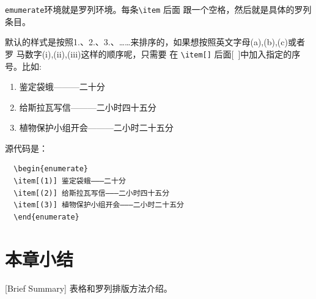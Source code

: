 \texttt{emumerate}环境就是罗列环境。每条\verb|\item| 后面
跟一个空格，然后就是具体的罗列条目。

默认的样式是按照1.、2.、3.、……来排序的，如果想按照英文字母(a),(b),(c)或者罗
马数字(i),(ii),(iii)这样的顺序呢，只需要
在 \verb|\item[]| 后面[~]中加入指定的序号。比如:
\begin{enumerate}
  \item[(1)] 鉴定袋蛾———二十分
  \item[(2)] 给斯拉瓦写信———二小时四十五分
  \item[(3)] 植物保护小组开会———二小时二十五分
\end{enumerate}
源代码是：
\begin{lstlisting}
  \begin{enumerate}
  \item[(1)] 鉴定袋蛾———二十分
  \item[(2)] 给斯拉瓦写信———二小时四十五分
  \item[(3)] 植物保护小组开会———二小时二十五分
  \end{enumerate}
\end{lstlisting}

\section{本章小结}[Brief Summary]
表格和罗列排版方法介绍。
